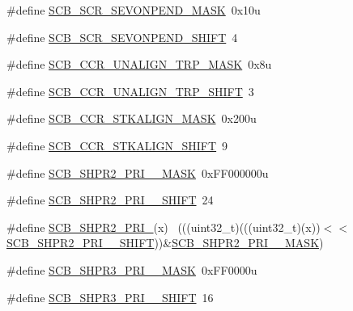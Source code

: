 \begin{DoxyCompactItemize}
\item 
\#define \hyperlink{group___s_c_b___register___masks_ga6603e0e99280ae6a73d7ddf1d38075f5}{S\+C\+B\+\_\+\+S\+C\+R\+\_\+\+S\+E\+V\+O\+N\+P\+E\+N\+D\+\_\+\+M\+A\+SK}~0x10u
\item 
\#define \hyperlink{group___s_c_b___register___masks_ga61abde1285bfce2342c1e93a1ecd3166}{S\+C\+B\+\_\+\+S\+C\+R\+\_\+\+S\+E\+V\+O\+N\+P\+E\+N\+D\+\_\+\+S\+H\+I\+FT}~4
\item 
\#define \hyperlink{group___s_c_b___register___masks_ga9d58c7dfa1dbab9f9bfa87a46504b9c2}{S\+C\+B\+\_\+\+C\+C\+R\+\_\+\+U\+N\+A\+L\+I\+G\+N\+\_\+\+T\+R\+P\+\_\+\+M\+A\+SK}~0x8u
\item 
\#define \hyperlink{group___s_c_b___register___masks_ga41a70c541532f6ad88b841c7da86c0f6}{S\+C\+B\+\_\+\+C\+C\+R\+\_\+\+U\+N\+A\+L\+I\+G\+N\+\_\+\+T\+R\+P\+\_\+\+S\+H\+I\+FT}~3
\item 
\#define \hyperlink{group___s_c_b___register___masks_ga41747ff80ad3657bcfa98a306feeee9d}{S\+C\+B\+\_\+\+C\+C\+R\+\_\+\+S\+T\+K\+A\+L\+I\+G\+N\+\_\+\+M\+A\+SK}~0x200u
\item 
\#define \hyperlink{group___s_c_b___register___masks_ga217ffb9b976391961423e4a0802fbe66}{S\+C\+B\+\_\+\+C\+C\+R\+\_\+\+S\+T\+K\+A\+L\+I\+G\+N\+\_\+\+S\+H\+I\+FT}~9
\item 
\#define \hyperlink{group___s_c_b___register___masks_ga3d791e5cf57bac7bf773150ba1f0683e}{S\+C\+B\+\_\+\+S\+H\+P\+R2\+\_\+\+P\+R\+I\+\_\+\_\+\+M\+A\+SK}~0x\+F\+F000000u
\item 
\#define \hyperlink{group___s_c_b___register___masks_ga4ccb3e607c07307c5ee1c749ff8da4ca}{S\+C\+B\+\_\+\+S\+H\+P\+R2\+\_\+\+P\+R\+I\+\_\+\_\+\+S\+H\+I\+FT}~24
\item 
\#define \hyperlink{group___s_c_b___register___masks_gafb1a543618040a0c1cde2d050554e99b}{S\+C\+B\+\_\+\+S\+H\+P\+R2\+\_\+\+P\+R\+I\+\_}(x)                                        ~(((uint32\+\_\+t)(((uint32\+\_\+t)(x))$<$$<$\hyperlink{group___s_c_b___register___masks_ga4ccb3e607c07307c5ee1c749ff8da4ca}{S\+C\+B\+\_\+\+S\+H\+P\+R2\+\_\+\+P\+R\+I\+\_\+\_\+\+S\+H\+I\+FT}))\&\hyperlink{group___s_c_b___register___masks_ga3d791e5cf57bac7bf773150ba1f0683e}{S\+C\+B\+\_\+\+S\+H\+P\+R2\+\_\+\+P\+R\+I\+\_\+\_\+\+M\+A\+SK})
\item 
\#define \hyperlink{group___s_c_b___register___masks_ga9f73cd19baa16589b1ea9b2049617e97}{S\+C\+B\+\_\+\+S\+H\+P\+R3\+\_\+\+P\+R\+I\+\_\+\_\+\+M\+A\+SK}~0x\+F\+F0000u
\item 
\#define \hyperlink{group___s_c_b___register___masks_ga10c07d5bebf4f0032304b2d73da48a48}{S\+C\+B\+\_\+\+S\+H\+P\+R3\+\_\+\+P\+R\+I\+\_\+\_\+\+S\+H\+I\+FT}~16
$$
\end{DoxyCompactItemize}
